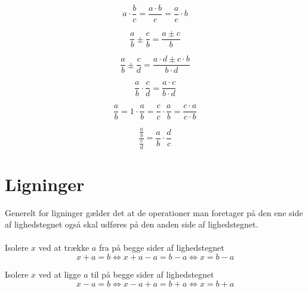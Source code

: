 \documentclass[11pt,a5paper,fleqn,leqno]{book}
\begin{document}
\begin{equation} \label{eq:konstant_gange_med_broek}
a \cdot \frac{b}{c} = \frac{a \cdot b}{c} = \frac{a}{c} \cdot b
\end{equation}

\begin{equation} \label{eq:broeker_med_ens_naevnere_plusminus}
\frac{a}{b} \pm \frac{c}{b} = \frac{a \pm c}{b}
\end{equation}

\begin{equation} \label{eq:broeker_med_forskellige_naevnere_plusminus}
\frac{a}{b} \pm \frac{c}{d} = \frac{a \cdot d \pm c \cdot b}{b \cdot d}
\end{equation}

\begin{equation} \label{eq:broeker_ganget_sammen}
\frac{a}{b} \cdot \frac{c}{d} = \frac{a \cdot c}{b \cdot d}
\end{equation}

\begin{equation} \label{eq:forlaenge_en_broek}
\frac{a}{b} = 1 \cdot \frac{a}{b} = \frac{c}{c} \cdot \frac{a}{b} = \frac{c \cdot a}{c \cdot b}
\end{equation}

\begin{equation} \label{eq:broeker_divideret}
\frac{\frac{a}{b}}{\frac{c}{d}} = \frac{a}{b} \cdot \frac{d}{c}
\end{equation}

\newpage

\section{Ligninger}

Generelt for ligninger gælder det at de operationer man foretager på den ene side af lighedstegnet også skal udføres på den anden side af lighedstegnet.
\\
\\
Isolere $x$ ved at trække $a$ fra på begge sider af lighedstegnet
\begin{equation} \label{eq:ligning_minus}
x + a = b \Leftrightarrow x + a - a = b - a \Leftrightarrow x = b - a
\end{equation}

Isolere $x$ ved at ligge $a$ til på begge sider af lighedstegnet
\begin{equation} \label{eq:ligning_plus}
x - a = b \Leftrightarrow x - a + a = b + a \Leftrightarrow x = b + a
\end{equation}
\end{document}
